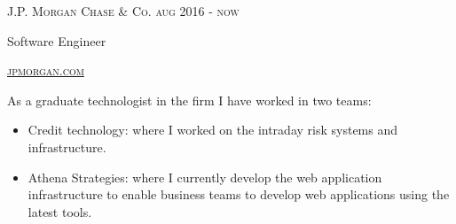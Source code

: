 {
  \textsc{\small{J.P. Morgan Chase \& Co. 
      \hfill
          {\raggedleft
              aug 2016 - now
          } \\
      }
  }
  {\raggedright\large {
   Software Engineer
  } \\}

  \textsc{\small\href{http://www.jpmorgan.com}{jpmorgan.com}}

  \normalsize{\raggedright
    As a graduate technologist in the firm I have worked in two teams:
    \begin{itemize}
    \item Credit technology: where I worked on the intraday risk systems and infrastructure.
    \item Athena Strategies: where I currently develop the web application infrastructure to enable
    business teams to develop web applications using the latest tools. 
    \end{itemize}
  }
}